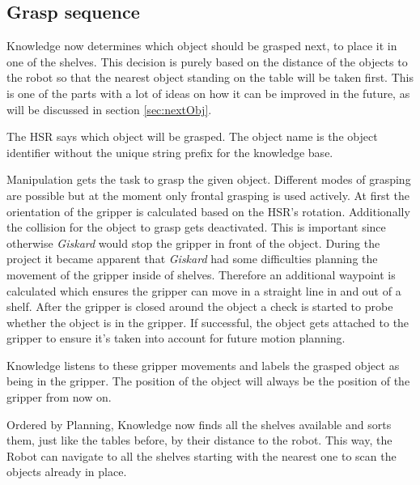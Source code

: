 \documentclass[main.tex]{subfiles}
\begin{document}
	\subsection{Grasp sequence}
	
	\label{grasp-object}
	\begin{knowledge}
	Knowledge now determines which object should be grasped next, to place it in one of the shelves. This decision is purely based on the distance of the objects to the robot so that the nearest object standing on the table will be taken first. This is one of the parts with a lot of ideas on how it can be improved in the future, as will be discussed in section \ref{sec:nextObj}.
	\end{knowledge}
	
	\begin{nlp}
	The HSR says which object will be grasped. The object name is the object identifier without the unique string prefix for the knowledge base.
	\end{nlp}
	
	\begin{manipulation}
	Manipulation gets the task to grasp the given object. Different modes of grasping are possible but at the moment only frontal grasping is used actively. At first the orientation of the gripper is calculated based on the HSR's rotation. Additionally the collision for the object to grasp gets deactivated. This is important since otherwise \textit{Giskard} would stop the gripper in front of the object. During the project it became apparent that \textit{Giskard} had some difficulties planning the movement of the gripper inside of shelves. Therefore an additional waypoint is calculated which ensures the gripper can move in a straight line in and out of a shelf. After the gripper is closed around the object a check is started to probe whether the object is in the gripper. If successful, the object gets attached to the gripper to ensure it's taken into account for future motion planning.   
	\end{manipulation}
	
	\begin{knowledge}
	Knowledge listens to these gripper movements and labels the grasped object as being in the gripper. The position of the object will always be the position of the gripper from now on.
	
	Ordered by Planning, Knowledge now finds all the shelves available and sorts them, just like the tables before, by their distance to the robot. This way, the Robot can navigate to all the shelves starting with the nearest one to scan the objects already in place.
	\end{knowledge}
	
\end{document}
